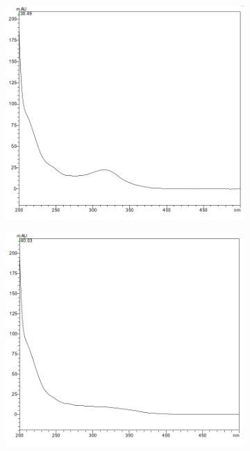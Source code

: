 \begin{figure}[!htbp]
  \begin{subfigure}[b]{0.5\textwidth}
    \includegraphics[width=\textwidth]{figures/Kapitel6/Reaktion3h/NCC3849.png}
    \caption{}
    \label{fig:NCC3849}
  \end{subfigure}
  \hfill
  \begin{subfigure}[b]{0.5\textwidth}
    \includegraphics[width=\textwidth]{figures/Kapitel6/Reaktion3h/DNCC4003.png}
    \caption{}
    \label{fig:DNCC4003}
  \end{subfigure}
  

\end{figure}
